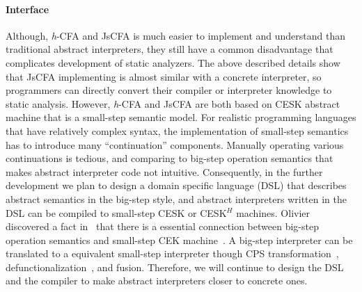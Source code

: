 \documentclass{article}
\begin{document}
\paragraph{Interface}
Although, \textit{h}-CFA and JsCFA is much easier to implement and understand than traditional abstract interpreters, they still have a common disadvantage that complicates development of static analyzers.
The above described details show that JsCFA implementing is almost similar with a concrete interpreter, so programmers can directly convert their compiler or interpreter knowledge to static analysis.
However, \textit{h}-CFA and JsCFA are both based on CESK abstract machine that is a small-step semantic model.
For realistic programming languages that have relatively complex syntax, the implementation of small-step semantics has to introduce many ``continuation'' components.
Manually operating various continuations is tedious, and comparing to big-step operation semantics that makes abstract interpreter code not intuitive.
Consequently, in the further development we plan to design a domain specific language (DSL) that describes abstract semantics in the big-step style, and abstract interpreters written in the DSL can be compiled to small-step CESK or CESK$^H$ machines.
Olivier discovered a fact in~\cite{danvy2008defunctionalized} that there is a essential connection between big-step operation semantics and small-step CEK machine~\cite{felleisen2009semantics}.
A big-step interpreter can be translated to a equivalent small-step interpreter though CPS transformation~\cite{danvy1992representing}, defunctionalization~\cite{danvy2001defunctionalization}, and fusion.
Therefore, we will continue to design the DSL and the compiler to make abstract interpreters closer to concrete ones.

\clearpage


\end{document}
